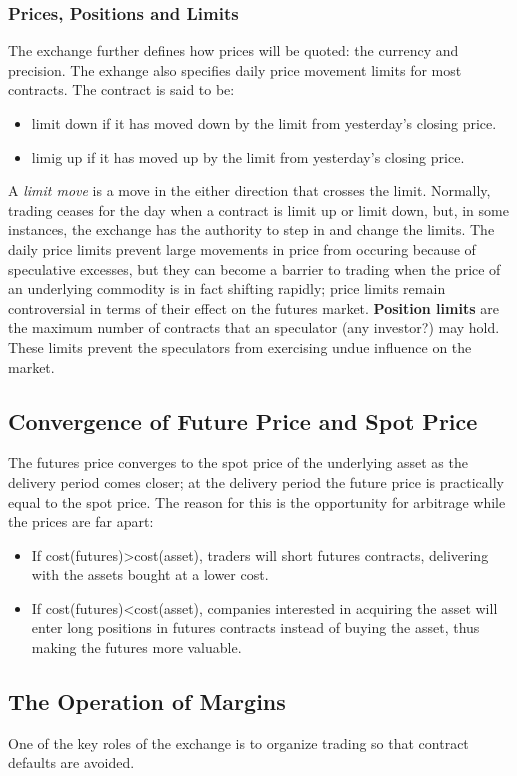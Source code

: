 \documentclass{article}
\begin{document}
\subsubsection*{Prices, Positions and Limits}
The exchange further defines how prices will be quoted: the currency and precision.
The exhange also specifies daily price movement limits for most contracts. The contract
is said to be:
\begin{itemize}
    \item limit down if it has moved down by the limit from yesterday's closing price.
    \item limig up if it has moved up by the limit from yesterday's closing price.
\end{itemize}
A \emph{limit move} is a move in the either direction that crosses the limit. Normally, trading
ceases for the day when a contract is limit up or limit down, but, in some instances, the exchange
has the authority to step in and change the limits. The daily price limits prevent large movements
in price from occuring because of speculative excesses, but they can become a barrier to trading
when the price of an underlying commodity is in fact shifting rapidly; price limits remain controversial
in terms of their effect on the futures market. \textbf{Position limits} are the maximum number of contracts
that an speculator (any investor?) may hold. These limits prevent the speculators from exercising undue
influence on the market.
\subsection{Convergence of Future Price and Spot Price}
The futures price converges to the spot price of the underlying asset as the delivery period comes closer; at
the delivery period the future price is practically equal to the spot price. The reason for this is the 
opportunity for arbitrage while the prices are far apart:
\begin{itemize}
    \item If cost(futures)>cost(asset), traders will short futures contracts, delivering with the assets bought at a lower cost.
    \item If cost(futures)<cost(asset), companies interested in acquiring the asset will enter long positions in futures contracts
    instead of buying the asset, thus making the futures more valuable.
\end{itemize}
\subsection{The Operation of Margins}
One of the key roles of the exchange is to organize trading so that contract defaults are avoided.
\end{document}
